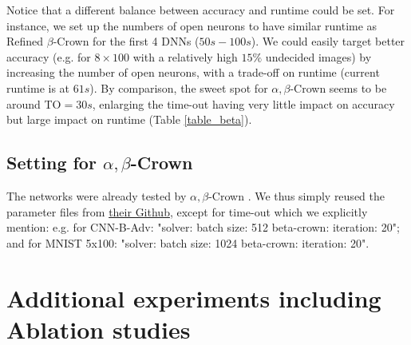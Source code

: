 Notice that a different balance between accuracy and runtime could be set. For instance, we set up the numbers of open neurons to have similar runtime as Refined $\beta$-Crown for the first 4 DNNs ($50s-100s$). We could easily target better accuracy (e.g. for $8 \times 100$ with a relatively high $15\%$ undecided images) by increasing the number of open neurons, with a trade-off on runtime (current runtime is at $61s$).
By comparison, the sweet spot for $\alpha,\beta$-Crown seems to be around TO$=30s$, enlarging the time-out having very little impact on accuracy but large impact on runtime
(Table \ref{table_beta}).






\subsection*{Setting for $\alpha,\beta$-Crown}

The networks were already tested by $\alpha,\beta$-Crown \cite{crown}. We thus simply reused the parameter files from \href{https://github.com/Verified-Intelligence/alpha-beta-CROWN/blob/main/complete_verifier/exp_configs/beta_crown/}{their Github}, 
except for time-out which we explicitly mention:
e.g. for CNN-B-Adv: "solver: batch size: 512 beta-crown: iteration: 20"; and
for MNIST 5x100: "solver: batch size: 1024 beta-crown: iteration: 20".






\section{Additional experiments including Ablation studies}	


